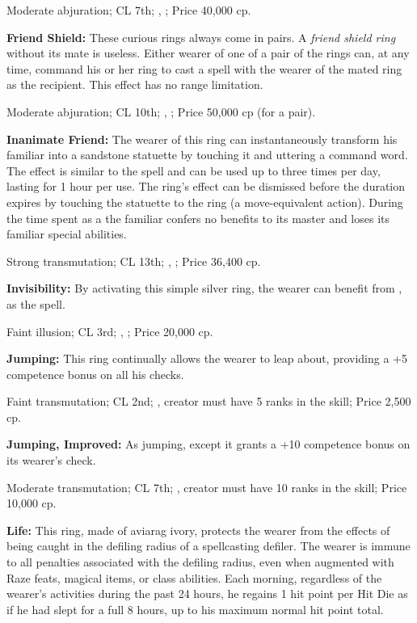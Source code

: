 Moderate abjuration; CL 7th; , ; Price 40,000 cp.

\textbf{Friend Shield:} These curious rings always come in pairs. A \emph{friend shield ring} without its mate is useless. Either wearer of one of a pair of the rings can, at any time, command his or her ring to cast a  spell with the wearer of the mated ring as the recipient. This effect has no range limitation.

Moderate abjuration; CL 10th; , ; Price 50,000 cp (for a pair).

\textbf{Inanimate Friend:} The wearer of this ring can instantaneously transform his familiar into a sandstone statuette by touching it and uttering a command word. The effect is similar to the  spell and can be used up to three times per day, lasting for 1 hour per use. The ring's effect can be dismissed before the duration expires by touching the statuette to the ring (a move-equivalent action). During the time spent as a  the familiar confers no benefits to its master and loses its familiar special abilities.

Strong transmutation; CL 13th; , ; Price 36,400 cp.

\textbf{Invisibility:} By activating this simple silver ring, the wearer can benefit from , as the spell.

Faint illusion; CL 3rd; , ; Price 20,000 cp.

\textbf{Jumping:} This ring continually allows the wearer to leap about, providing a +5 competence bonus on all his  checks.

Faint transmutation; CL 2nd; , creator must have 5 ranks in the  skill; Price 2,500 cp.

\textbf{Jumping, Improved:} As jumping, except it grants a +10 competence bonus on its wearer's  check.

Moderate transmutation; CL 7th; , creator must have 10 ranks in the  skill; Price 10,000 cp.

\textbf{Life:} This ring, made of aviarag ivory, protects the wearer from the effects of being caught in the defiling radius of a spellcasting defiler. The wearer is immune to all penalties associated with the defiling radius, even when augmented with Raze feats, magical items, or class abilities. Each morning, regardless of the wearer's activities during the past 24 hours, he regains 1 hit point per Hit Die as if he had slept for a full 8 hours, up to his maximum normal hit point total.

